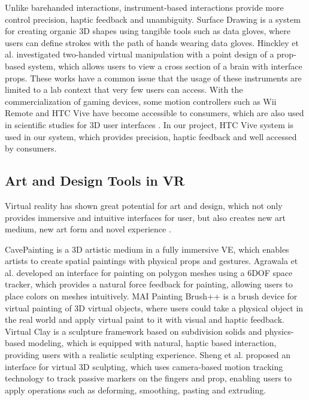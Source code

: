 \documentclass{svjour3}                     %
\begin{document}
Unlike barehanded interactions, instrument-based interactions provide more control precision, haptic feedback and unambiguity.
Surface Drawing \cite{schkolne2001surface} is a system for creating organic 3D shapes using tangible tools such as data gloves, where users can define strokes with the path of hands wearing data gloves.
Hinckley et al. \cite{hinckley1998two} investigated two-handed virtual manipulation with a point design of a prop-based system, which allows users to view a cross section of a brain with interface props.
These works have a common issue that the usage of these instruments are limited to a lab context that very few users can access.
%
With the commercialization of gaming devices, some motion controllers such as Wii Remote and HTC Vive have become accessible to consumers, which are also used in scientific studies for 3D user interfaces \cite{wingcrave2010wii,niehorster2017accuracy}.
%
In our project, HTC Vive system is used in our system, which provides precision, haptic feedback and well accessed by consumers.

\subsection{Art and Design Tools in VR}
\label{sec:2.2}
Virtual reality has shown great potential for art and design, which not only provides immersive and intuitive interfaces for user, but also creates new art medium, new art form and novel experience \cite{laviola20113d}.

CavePainting \cite{keefe2001cavepainting} is a 3D artistic medium in a fully immersive VE, which enables artists to create spatial paintings with physical props and gestures. Agrawala et al. \cite{agrawala19953d} developed an interface for painting on polygon meshes using a 6DOF space tracker, which provides a natural force feedback for painting, allowing users to place colors on meshes intuitively. MAI Painting Brush++ \cite{otsuki2017brush} is a brush device for virtual painting of 3D virtual objects, where users could take a physical object in the real world and apply virtual paint to it with visual and haptic feedback.
Virtual Clay \cite{mcdonnell2001virtual} is a sculpture framework based on subdivision solids and physics-based modeling, which is equipped with natural, haptic based interaction, providing users with a realistic sculpting experience. Sheng et al. \cite{sheng2006interface} proposed an interface for virtual 3D sculpting, which uses camera-based motion tracking technology to track passive markers on the fingers and prop, enabling users to apply operations such as deforming, smoothing, pasting and extruding.
\end{document}
